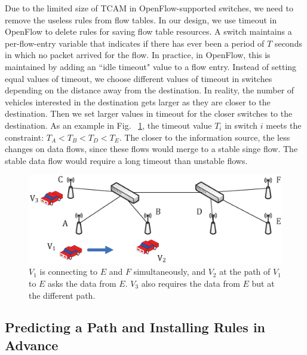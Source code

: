 \documentclass[journal]{IEEEtran}
\begin{document}
Due to the limited size of TCAM in OpenFlow-supported switches, we need to remove the useless rules from flow tables. In our design, we use timeout in OpenFlow to delete rules for saving flow table resources. A switch maintains a per-flow-entry variable that indicates if there has ever been a period of $T$ seconds in which no packet arrived for the flow. In practice, in OpenFlow, this is maintained by adding an ``idle timeout" value to a flow entry. Instead of setting equal values of timeout, we choose different values of timeout in switches depending on the distance away from the destination. In reality, the number of vehicles interested in the destination gets larger as they are closer to the destination. Then we set larger values in timeout for the closer switches to the destination. As an example in Fig. ~\ref{fig4}, the timeout value $T_{i}$ in switch $i$ meets the constraint: $T_{A} < T_{B} < T_{D} < T_{E}$. The closer to the information source, the less changes on data flows, since these flows would merge to a stable singe flow. The stable data flow would require a long timeout than unstable flows.


\begin{figure} [t]
\begin{center}
\includegraphics[width=1\columnwidth]{fig-4-31.eps}

\caption{$V_{1}$ is connecting to $E$ and $F$ simultaneously, and $V_{2}$ at the path of $V_{1}$ to $E$ asks the data from $E$. $V_{3}$ also requires the data from $E$ but at the different path.} \label{fig4}
\end{center}
\end{figure}

\subsection{Predicting a Path and Installing Rules in Advance} \label{Predict the path}
\end{document}
